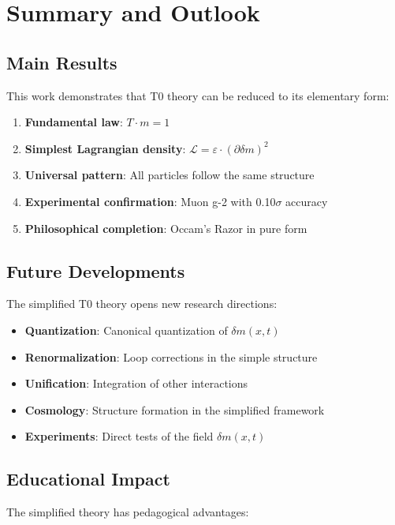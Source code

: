 \documentclass[12pt,a4paper]{article}
\newcommand{\deltam}{\delta m}
\newcommand{\Lag}{\mathcal{L}}
\theoremstyle{definition}
\theoremstyle{remark}
\begin{document}
	\section{Summary and Outlook}
	
	\subsection{Main Results}
	
	This work demonstrates that T0 theory can be reduced to its elementary form:
	
	\begin{enumerate}
		\item \textbf{Fundamental law}: $T \cdot m = 1$
		\item \textbf{Simplest Lagrangian density}: $\Lag = \varepsilon \cdot (\partial \deltam)^2$
		\item \textbf{Universal pattern}: All particles follow the same structure
		\item \textbf{Experimental confirmation}: Muon g-2 with 0.10$\sigma$ accuracy
		\item \textbf{Philosophical completion}: Occam's Razor in pure form
	\end{enumerate}
	
	\subsection{Future Developments}
	
	The simplified T0 theory opens new research directions:
	
	\begin{itemize}
		\item \textbf{Quantization}: Canonical quantization of $\deltam(x,t)$
		\item \textbf{Renormalization}: Loop corrections in the simple structure
		\item \textbf{Unification}: Integration of other interactions
		\item \textbf{Cosmology}: Structure formation in the simplified framework
		\item \textbf{Experiments}: Direct tests of the field $\deltam(x,t)$
	\end{itemize}
	
	\subsection{Educational Impact}
	
	The simplified theory has pedagogical advantages:
	
\end{document}

